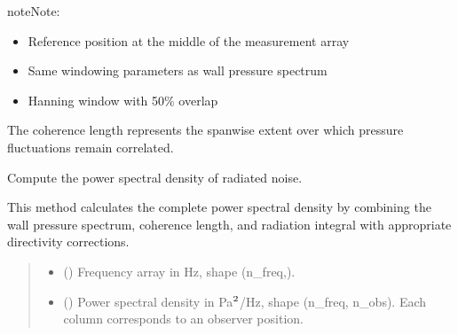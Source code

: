 \documentclass[letterpaper,10pt,english]{sphinxmanual}
\begin{document}
\begin{fulllineitems}
\begin{fulllineitems}
\begin{sphinxadmonition}{note}{Note:}
\begin{itemize}
\item {} 
\sphinxAtStartPar
Reference position at the middle of the measurement array

\item {} 
\sphinxAtStartPar
Same windowing parameters as wall pressure spectrum

\item {} 
\sphinxAtStartPar
Hanning window with 50\% overlap

\end{itemize}
\end{sphinxadmonition}

\sphinxAtStartPar
The coherence length represents the spanwise extent over which
pressure fluctuations remain correlated.

\end{fulllineitems}


\begin{fulllineitems}
\label{\detokenize{amiet_model:amiet_self_noise.amiet_model.AmietModel.compute_psd}}
\pysigstartsignatures
\pysiglinewithargsret
{}
{}
{}
\pysigstopsignatures
\sphinxAtStartPar
Compute the power spectral density of radiated noise.

\sphinxAtStartPar
This method calculates the complete power spectral density by
combining the wall pressure spectrum, coherence length, and
radiation integral with appropriate directivity corrections.
\begin{quote}\begin{description}
\sphinxAtStartPar
\begin{itemize}
\item {} 
\sphinxAtStartPar
{} () \textendash{} Frequency array in Hz, shape (n\_freq,).

\item {} 
\sphinxAtStartPar
{} () \textendash{} Power spectral density in Pa\(\sp{\text{2}}\)/Hz, shape (n\_freq, n\_obs).
Each column corresponds to an observer position.

\end{itemize}


\end{description}\end{quote}


\end{fulllineitems}
\end{fulllineitems}
\end{document}

